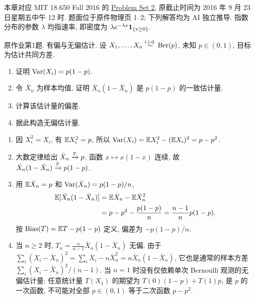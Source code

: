 \label{chap:ps02}
本章对应 MIT 18.650 Fall 2016 的 \href{https://ocw.mit.edu/courses/18-650-statistics-for-applications-fall-2016/resources/problem-set-2/}{Problem Set 2}, 原截止时间为 2016 年 9 月 23 日星期五中午 12 时. 题面位于原件物理页 1--2; 下列解答均为 AI 独立推导. 指数分布的参数 $\lambda$ 均指速率, 即密度为 $\lambda e^{-\lambda x}\mathbf 1_{\{x\ge0\}}$.

\begin{exercise}\label{ps02:p01}
原作业第1题. 有偏与无偏估计. 设 $X_1,\ldots,X_n\stackrel{\mathrm{i.i.d.}}{\sim}\operatorname{Ber}(p)$, 未知 $p\in(0,1)$, 目标为估计共同方差.
\begin{enumerate}[label=\arabic*.]
\item 证明 $\operatorname{Var}(X_i)=p(1-p)$.
\item 令 $\bar X_n$ 为样本均值, 证明 $\bar X_n(1-\bar X_n)$ 是 $p(1-p)$ 的一致估计量.
\item 计算该估计量的偏差.
\item 据此构造无偏估计量.
\end{enumerate}
\end{exercise}
\begin{solution}
\begin{enumerate}[label=\arabic*.]
\item 因 $X_i^2=X_i$, 有 $\mathbb E X_i^2=p$, 所以 $\operatorname{Var}(X_i)=\mathbb E X_i^2-(\mathbb E X_i)^2=p-p^2$.
\item 大数定律给出 $\bar X_n\xrightarrow{\mathbb P} p$. 函数 $x\mapsto x(1-x)$ 连续, 故 $\bar X_n(1-\bar X_n)\xrightarrow{\mathbb P} p(1-p)$.
\item 用 $\mathbb E\bar X_n=p$ 和 $\operatorname{Var}(\bar X_n)=p(1-p)/n$,
\begin{align*}
\mathbb E[\bar X_n(1-\bar X_n)]
&=\mathbb E\bar X_n-\mathbb E\bar X_n^2\\
&=p-p^2-\frac{p(1-p)}n
=\frac{n-1}n p(1-p).
\end{align*}
按 $\operatorname{Bias}(T)=\mathbb E T-p(1-p)$ 定义, 偏差为 $-p(1-p)/n$.
\item 当 $n\ge2$ 时, $T_n=\frac n{n-1}\bar X_n(1-\bar X_n)$ 无偏. 由于
$\sum_i(X_i-\bar X_n)^2=\sum_iX_i-n\bar X_n^2=n\bar X_n(1-\bar X_n)$,
它也是通常的样本方差 $\sum_i(X_i-\bar X_n)^2/(n-1)$. 当 $n=1$ 时没有仅依赖单次 Bernoulli 观测的无偏估计量: 任意统计量 $T(X_1)$ 的期望为 $T(0)(1-p)+T(1)p$, 是 $p$ 的一次函数, 不可能对全部 $p\in(0,1)$ 等于二次函数 $p-p^2$.
\end{enumerate}
\end{solution}

